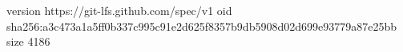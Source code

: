 version https://git-lfs.github.com/spec/v1
oid sha256:a3c473a1a5ff0b337c995c91e2d625f8357b9db5908d02d699e93779a87e25bb
size 4186
